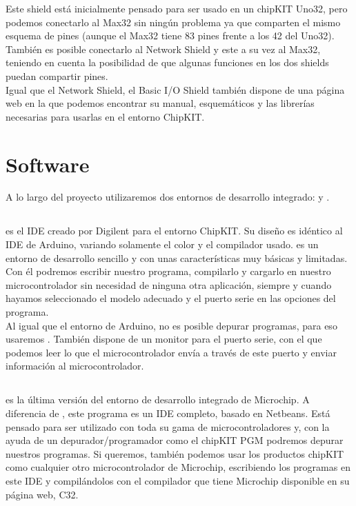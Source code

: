 Este shield está inicialmente pensado para ser usado en un chipKIT Uno32, pero podemos conectarlo al Max32 sin ningún problema ya que comparten el mismo esquema de pines (aunque el Max32 tiene 83 pines frente a los 42 del Uno32). También es posible conectarlo al Network Shield y este a su vez al Max32, teniendo en cuenta la posibilidad de que algunas funciones en los dos shields puedan compartir pines.\\

Igual que el Network Shield, el Basic I/O Shield también dispone de una página web\cite{website:io_shield} en la que podemos encontrar su manual, esquemáticos y las librerías necesarias para usarlas en el entorno ChipKIT.

\newpage

\section{Software} A lo largo del proyecto utilizaremos dos entornos de
desarrollo integrado:  y .
\subsection{} \cite{website:mpide} es el IDE
creado por Digilent para el entorno ChipKIT. Su diseño es idéntico al IDE de
Arduino, variando solamente el color y el compilador usado.
  es
un entorno de desarrollo sencillo y con unas características muy básicas y
limitadas. Con él podremos escribir nuestro programa, compilarlo y cargarlo en
nuestro microcontrolador sin necesidad de ninguna otra aplicación, siempre y
cuando hayamos seleccionado el modelo adecuado y el puerto serie en las
opciones del programa. \\ Al igual que el entorno de Arduino, no es posible
depurar programas, para eso usaremos . También dispone de un monitor
para el puerto serie, con el que podemos leer lo que el microcontrolador envía
a través de este puerto y enviar información al microcontrolador.
\subsection{} \cite{website:mplab} es la última versión del
entorno de desarrollo integrado de Microchip. A diferencia de
, este programa es un IDE completo, basado en Netbeans. Está
pensado para ser utilizado con toda su gama de microcontroladores y, con la
ayuda de un depurador/programador como el chipKIT PGM podremos depurar
nuestros programas. Si queremos, también podemos usar los productos chipKIT
como cualquier otro microcontrolador de Microchip, escribiendo los programas
en este IDE y compilándolos con el compilador que tiene Microchip disponible
en su página web, C32\cite{website:c32}. 

